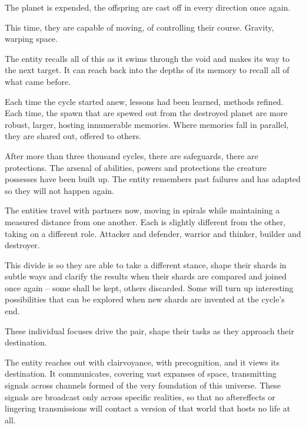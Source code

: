 The planet is expended, the offspring are cast off in every direction once again.



This time, they are capable of moving, of controlling their course.  Gravity, warping space.



The entity recalls all of this as it swims through the void and makes its way to the next target.  It can reach back into the depths of its memory to recall all of what came before.



Each time the cycle started anew, lessons had been learned, methods refined.  Each time, the spawn that are spewed out from the destroyed planet are more robust, larger, hosting innumerable memories.  Where memories fall in parallel, they are shared out, offered to others.



After more than three thousand cycles, there are safeguards, there are protections.  The arsenal of abilities, powers and protections the creature possesses have been built up.  The entity remembers past failures and has adapted so they will not happen again.



The entities travel with partners now, moving in spirals while maintaining a measured distance from one another.  Each is slightly different from the other, taking on a different role.  Attacker and defender, warrior and thinker, builder and destroyer.



This divide is so they are able to take a different stance, shape their shards in subtle ways and clarify the results when their shards are compared and joined once again – some shall be kept, others discarded.  Some will turn up interesting possibilities that can be explored when new shards are invented at the cycle's end.



These individual focuses drive the pair, shape their tasks as they approach their destination.



The entity reaches out with clairvoyance, with precognition, and it views its destination.  It communicates, covering vast expanses of space, transmitting signals across channels formed of the very foundation of this universe.  These signals are broadcast only across specific realities, so that no aftereffects or lingering transmissions will contact a version of that world that hosts no life at all.



